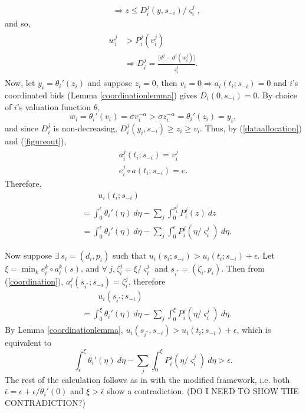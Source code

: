 \documentclass[12pt]{article}
\theoremstyle{definition}
\newcommand{\vs}{\varsigma}
\begin{document}
\begin{multicols}{2}
\begin{align*}
    &\Rightarrow
    z \le D_i^j(y,s_{-i})/\vs_i^j,
\end{align*}
and so,
\begin{align}\label{figureout}
\begin{split}
    w_i^j & > {P}_i^j(v_i^j) \\
    &\Rightarrow {D}_i^j = \frac{\lbrack d^j - d^j(w_i^j)\rbrack}{\vs_i^j}.
\end{split}
\end{align}
Now, let $y_i = {\theta_i}'(z_i)$ and suppose $z_i = 0$, then $v_i=0 \Rightarrow
a_i(t_i; s_{-i})=0$ and $i$'s coordinated bids (Lemma \ref{coordinationlemma})
gives $\bar{D}_i(0,s_{-i}) =0$. 
By choice of $i$'s valuation function $\theta$,
$$
w_i = {\theta_i}'(v_i) =\sigma v_i^{-\alpha} >  \sigma
z_i^{-\alpha} = {\theta_i}'(z_i) = y_i,
$$
and since $D_i^j$ is non-decreasing, $D_i^j(y_i,s_{-i}) \ge z_i \ge v_i$.
Thus, by (\ref{dataallocation}) and (\ref{figureout}),
\begin{align*}
    a_i^j(t_i; s_{-i}) = v_i^j \\
    e_i^j \circ a(t_i;s_{-i}) = e.
\end{align*}
Therefore,
\begin{align*}
    &\qquad u_i(t_i;s_{-i}) \\
    &= \displaystyle\int_0^\epsilon {\theta_i}'(\eta) \ d\eta -
\sum_j \int_0^{v_i^j} P_i^j(z) \ dz \\
    &= \int_0^\epsilon {\theta_i}'(\eta) \ d\eta - \sum_j\int_0^\epsilon
P_i^j(\eta/\vs_i^j) \ d\eta.
\end{align*}

Now suppose $\exists \ s_i = (d_i, p_i)$ such that $u_i(s_i;s_{-i}) > u_i(t_i;
s_{-i}) + \epsilon$. Let $\xi = \min_k e_i^k\circ a_i^k(s)$, and $\forall \ j,
\zeta_i^j = \xi/\vs_i^j$ and $s_{i^*} = (\zeta_i,p_i)$. Then from
(\ref{coordination}), $a_i^j(s_{i^*}; s_{-i}) = \zeta_i^j$, therefore
\begin{align*}
    &\qquad u_i(s_{i^*};s_{-i}) \\
    &= \displaystyle\int_0^\xi {\theta_i}'(\eta)\ d\eta -\sum_j\int_0^\xi P_i^j(\eta/\vs_i^j) \ d\eta.
\end{align*}
By Lemma \ref{coordinationlemma}, $u_i(s_{i^*}, s_{-i}) > u_i(t_i; s_{-i}) +
\epsilon$, which is equivalent to 
$$
    \int_\epsilon^\xi {\theta_i}'(\eta) \ d\eta - \sum_j\int_0^\xi
P_i^j(\eta/\vs_i^j) \ d\eta > \epsilon.
$$
The rest of the calculation follows as in \cite{semret} with the modified
framework, i.e. both $\bar\epsilon = \epsilon + \epsilon/{\theta_i}'(0)$ and
$\xi > \bar\epsilon$ show a contradiction.
(DO I NEED TO SHOW THE CONTRADICTION?)


\end{multicols}
\end{document}
